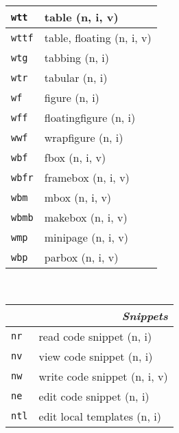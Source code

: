 \documentclass[oneside,10pt,landscape,DIV16]{scrartcl}
\newcommand{\Map}[1] {\textbf{\textasciiacute}\texttt{#1}}
\begin{document}
\begin{multicols}{3}
\begin{center}
\begin{tabular}[]{|p{11mm}|p{60mm}|}
\hline
\hline  \Map{wtt}  & table                    \hfill (n, i, v)\\
\hline  \Map{wttf} & table, floating          \hfill (n, i, v)\\
\hline  \Map{wtg}  & tabbing                  \hfill (n, i)\\
\hline  \Map{wtr}  & tabular                  \hfill (n, i)\\
\hline
\hline  \Map{wf}   & figure                   \hfill (n, i)\\
\hline  \Map{wff}  & floatingfigure           \hfill (n, i)\\
\hline  \Map{wwf}  & wrapfigure               \hfill (n, i)\\
\hline
\hline  \Map{wbf}  & fbox                     \hfill (n, i, v)\\
\hline  \Map{wbfr} & framebox                 \hfill (n, i, v)\\
\hline  \Map{wbm}  & mbox                     \hfill (n, i, v)\\
\hline  \Map{wbmb} & makebox                  \hfill (n, i, v)\\
\hline  \Map{wmp}  & minipage                 \hfill (n, i, v)\\
\hline  \Map{wbp}  & parbox                   \hfill (n, i, v)\\
\hline
%
\end{tabular}\\
%
\begin{tabular}[]{|p{11mm}|p{62mm}|}
\hline
\multicolumn{2}{|r|}{\textsl{S\textbf{n}ippets}}                \\[1.0ex]
\hline \Map{nr}  & read code snippet         \hfill (n, i)   \\
\hline \Map{nv}  & view code snippet         \hfill (n, i)   \\
\hline \Map{nw}  & write code snippet        \hfill (n, i, v)\\
\hline \Map{ne}  & edit code snippet         \hfill (n, i)   \\
\hline
\hline \Map{ntl} & edit local templates      \hfill (n, i)   \\

\end{tabular}
\end{center}
\end{multicols}
\end{document}
